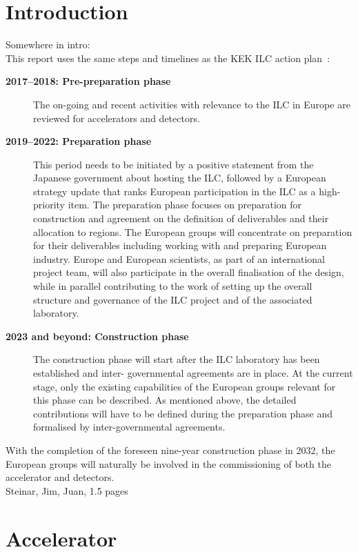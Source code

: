 \documentclass[%
 reprint,
 amsmath,amssymb,
 aps,
]{revtex4-1}
\begin{document}
\section{\label{sec:intro}Introduction}
Somewhere in intro: \\
This report uses the same steps and timelines as the KEK ILC action plan~\cite{kekactionplan}:
\begin{description}
\item[\bfseries 2017--2018: Pre-preparation phase] 
The on-going and recent activities with relevance to the ILC in Europe are reviewed for accelerators and detectors.
\item[\bfseries 2019--2022: Preparation phase]
This period needs to be initiated by a positive statement from the Japanese government about hosting the ILC, followed by a European strategy update that ranks European participation in the ILC as a high-priority item. The preparation phase focuses on preparation for construction and agreement on the definition of deliverables and their allocation to regions. The European groups will concentrate on preparation for their deliverables including working with and preparing European industry. Europe and European scientists, as part of an international project team, will also participate in the overall finalisation of the design, while in parallel contributing to the work of setting up the overall structure and governance of the ILC project and of the associated laboratory.
\item[\bfseries 2023 and beyond: Construction phase]
The construction phase will start after the ILC laboratory has been established and inter- governmental agreements are in place. At the current stage, only the existing capabilities of the European groups relevant for this phase can be described. As mentioned above, the detailed contributions will have to be defined during the preparation phase and formalised by inter-governmental agreements. 
\end{description}

With the completion of the foreseen nine-year construction phase in 2032, the European groups will naturally be involved in the commissioning of both the accelerator and detectors. \\
Steinar, Jim, Juan, 1.5 pages

\section{\label{sec:acc}Accelerator}
\end{document}
